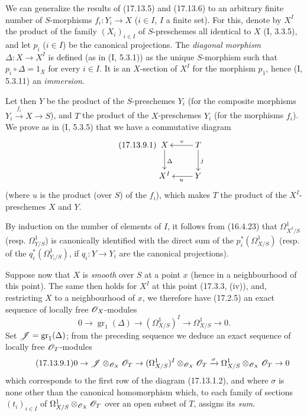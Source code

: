 \begin{env}[17.13.9]
\label{IV.17.13.9}
We can generalize the results of (17.13.5) and (17.13.6) to an arbitrary finite number of $S$-morphisms $f_i:Y_i\to X$ ($i\in I$, $I$ a finite set). For this, denote by $X^I$ the product of the family $(X_i)_{i\in I}$ of $S$-preschemes all identical to $X$ (I, 3.3.5), and let $p_i$ ($i\in I$) be the canonical projections. The \emph{diagonal morphism} $\Delta:X\to X^I$ is defined (as in (I, 5.3.1)) as the unique $S$-morphism such that $p_i\circ\Delta=1_X$ for every $i\in I$. It is an $X$-section of $X^I$ for the morphism $p_1$, hence (I, 5.3.11) an \emph{immersion}.


Let then $Y$ be the product of the $S$-preschemes $Y_i$ (for the composite morphisms $Y_i\xrightarrow{f_i}X\to S$), and $T$ the product of the $X$-preschemes $Y_i$ (for the morphisms $f_i$). We prove as in (I, 5.3.5) that we have a commutative diagram
\[
\label{IV.17.13.9.1}
\tag{17.13.9.1}
\xymatrix{
  X \ar[d]^{\Delta} & T \ar[l]_-v \ar[d]^{j}\\
  X^I & Y \ar[l]^{u}
}
\]
(where $u$ is the product (over $S$) of the $f_i$), which makes $T$ the product of the $X^I$-preschemes $X$ and $Y$.

By induction on the number of elements of $I$, it follows from (16.4.23) that $\Omega^1_{X^I/S}$ (resp. $\Omega^1_{Y/S}$) is canonically identified with the direct sum of the $p_i^*(\Omega^1_{X/S})$ (resp. of the $q_i^*(\Omega^1_{Y_i/S})$, if $q_i:Y\to Y_i$ are the canonical projections).

Suppose now that $X$ is \emph{smooth} over $S$ at a point $x$ (hence in a neighbourhood of this point). The same then holds for $X^I$ at this point (17.3.3, (iv)), and, restricting $X$ to a neighbourhood of $x$, we therefore have (17.2.5) an exact sequence of locally free $\mathscr{O}_X$-modules
\[
0\to\operatorname{gr}_1(\Delta)\to(\Omega^1_{X/S})^I\to\Omega^1_{X/S}\to0.
\]
Set $\mathscr{J}=\operatorname{gr}_1(\Delta)$; from the preceding sequence we deduce an exact sequence of locally free $\mathscr{O}_T$-modules
\[
\label{IV.17.13.9.1-seq}
\tag{17.13.9.1}
0\to\mathscr{J}\otimes_{\mathscr{O}_X}\mathscr{O}_T\to(\Omega^1_{X/S})^I\otimes_{\mathscr{O}_X}\mathscr{O}_T\xrightarrow{\sigma}\Omega^1_{X/S}\otimes_{\mathscr{O}_X}\mathscr{O}_T\to0
\]
which corresponds to the first row of the diagram (17.13.1.2), and where $\sigma$ is none other than the canonical homomorphism which, to each family of sections $(t_i)_{i\in I}$ of $\Omega^1_{X/S}\otimes_{\mathscr{O}_X}\mathscr{O}_T$ over an open subset of $T$, assigns its \emph{sum}.


\end{env}
